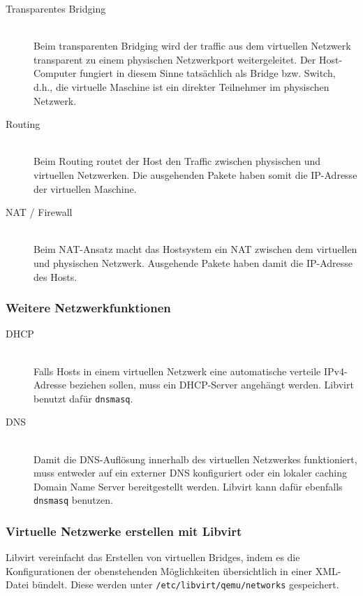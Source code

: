 \begin{description}
	\item[Transparentes Bridging] \hfill \\
		Beim transparenten Bridging wird der traffic aus dem virtuellen Netzwerk transparent zu einem physischen Netzwerkport weitergeleitet. Der Host-Computer fungiert in diesem Sinne tatsächlich als Bridge bzw. Switch, d.h., die virtuelle Maschine ist ein direkter Teilnehmer im physischen Netzwerk.
	\item[Routing] \hfill \\
		Beim Routing routet der Host den Traffic zwischen physischen und virtuellen Netzwerken. Die ausgehenden Pakete haben somit die IP-Adresse der virtuellen Maschine.
	\item[NAT / Firewall] \hfill \\
		Beim NAT-Ansatz macht das Hostsystem ein NAT zwischen dem virtuellen und physischen Netzwerk. Ausgehende Pakete haben damit die IP-Adresse des Hosts.
\end{description}


\subsubsection{Weitere Netzwerkfunktionen}
\begin{description}
	\item[DHCP] \hfill \\
		Falls Hosts in einem virtuellen Netzwerk eine automatische verteile IPv4-Adresse beziehen sollen, muss ein DHCP-Server angehängt werden. Libvirt benutzt dafür \lstinline|dnsmasq|.
	\item[DNS] \hfill \\
		Damit die DNS-Auflösung innerhalb des virtuellen Netzwerkes funktioniert, muss entweder auf ein externer DNS konfiguriert oder ein lokaler caching Domain Name Server bereitgestellt werden. Libvirt kann dafür ebenfalls \lstinline|dnsmasq| benutzen.
\end{description}

\subsubsection{Virtuelle Netzwerke erstellen mit Libvirt}
Libvirt vereinfacht das Erstellen von virtuellen Bridges, indem es die Konfigurationen der obenstehenden Möglichkeiten übersichtlich in einer XML-Datei bündelt. Diese werden unter \lstinline|/etc/libvirt/qemu/networks| gespeichert.

